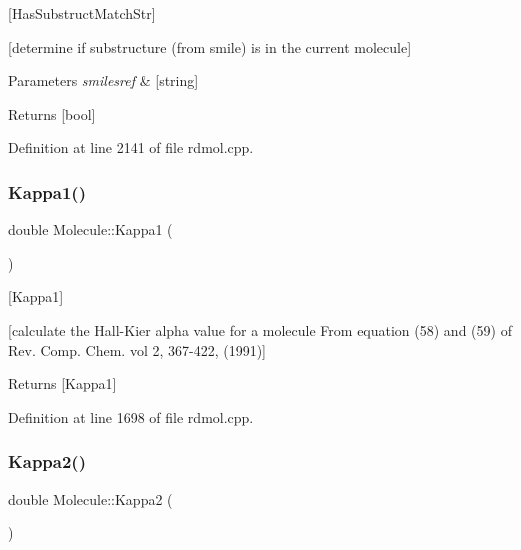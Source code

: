 \mbox{[}Has\+Substruct\+Match\+Str\mbox{]} 

\mbox{[}determine if substructure (from smile) is in the current molecule\mbox{]}


\begin{DoxyParams}{Parameters}
{\em smilesref} & \mbox{[}string\mbox{]} \\
\hline
\end{DoxyParams}
\begin{DoxyReturn}{Returns}
\mbox{[}bool\mbox{]} 
\end{DoxyReturn}


Definition at line 2141 of file rdmol.\+cpp.

\mbox{\label{class_molecule_ae4e3b1f59d36dde20ffded165b417288}} 
\subsubsection{\texorpdfstring{Kappa1()}{Kappa1()}}
{\footnotesize\ttfamily double Molecule\+::\+Kappa1 (\begin{DoxyParamCaption}{ }\end{DoxyParamCaption})}



\mbox{[}Kappa1\mbox{]} 

\mbox{[}calculate the Hall-\/\+Kier alpha value for a molecule From equation (58) and (59) of Rev. Comp. Chem. vol 2, 367-\/422, (1991)\mbox{]}

\begin{DoxyReturn}{Returns}
\mbox{[}Kappa1\mbox{]} 
\end{DoxyReturn}


Definition at line 1698 of file rdmol.\+cpp.

\mbox{\label{class_molecule_a27ded481f6abb14e5531e645713effe3}} 
\subsubsection{\texorpdfstring{Kappa2()}{Kappa2()}}
{\footnotesize\ttfamily double Molecule\+::\+Kappa2 (\begin{DoxyParamCaption}{ }\end{DoxyParamCaption})}



